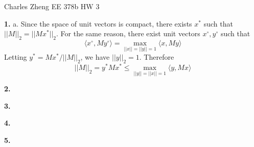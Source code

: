 \documentclass[11pt]{article}
\begin{document}
\newcommand{\tr}{\text{tr}}
\newcommand{\E}{\textbf{E}}
\newcommand{\diag}{\text{diag}}
\newcommand{\argmax}{\text{argmax}}
\newcommand{\Cov}{\text{Cov}}
\newcommand{\Var}{\text{Var}}
\renewcommand{\thefootnote}{\fnsymbol{footnote}}

\begin{center}
\noindent Charles Zheng EE 378b HW 3
\end{center}

\noindent\textbf{1.}
a.
Since the space of unit vectors is compact,
there exists $x^*$ such that $||M||_2 = ||Mx^*||_2$.
For the same reason, there exist unit vectors $x^\circ, y^\circ$ such that
\[
\langle x^\circ, M y^\circ \rangle = \max_{||x|| = ||y|| = 1} \langle x, My \rangle
\]
Letting $y^* = Mx^*/||M||_2$, we have $||y||_2 = 1$.
Therefore
\[
||M||_2 = y^* M x^* \leq \max_{||y||=||x||=1} \langle y, Mx \rangle
\]


\noindent\textbf{2.}

\noindent\textbf{3.}

\noindent\textbf{4.}

\noindent\textbf{5.}
\end{document}
